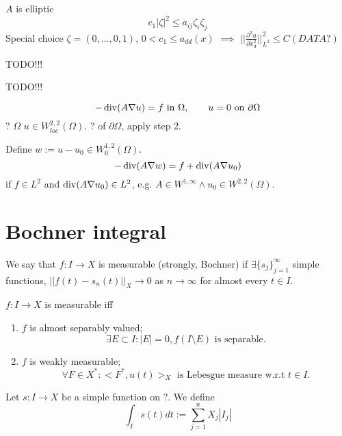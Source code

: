 \documentclass[12pt]{article}					%
\begin{document}
\begin{veta}
\begin{dukazin}
		$A$ is elliptic
		$$ c_1|\zeta|^2 ≤ a_{ij} \zeta_i\zeta_j $$
		Special choice $\zeta = (0, …, 0, 1)$, $0 < c_1 ≤ a_{dd}(x)$ $\implies$ $||\frac{\partial^2 u}{\partial x_d^2}||_{L^2}^2 ≤ C(DATA?) $
	\end{dukazin}

	\begin{dukazin}
		TODO!!!	


		TODO!!!
	\end{dukazin}

	\begin{dukazin}
		$$ -\operatorname{div}(A \nabla u) = f \text{ in } \Omega, \qquad u = 0 \text{ on } \partial \Omega $$
		? $\Omega$ $u \in W_{loc}^{2, 2}(\Omega)$. ? of $\partial \Omega$, apply step 2.

		Define $w := u - u_0 \in W_0^{1, 2}(\Omega)$.
		$$ -\operatorname{div}(A \nabla w) = f + \operatorname{div}(A \nabla u_0) $$
		if $f \in L^2$ and $\operatorname{div}(A \nabla u_0) \in L^2$, e.g. $A \in W^{1, ∞} \land u_0 \in W^{2, 2}(\Omega)$.
	\end{dukazin}
\end{veta}

\section{Bochner integral}
\begin{definice}[Measurability]
	We say that $f: I \rightarrow X$ is measurable (strongly, Bochner) if $\exists \{s_j\}_{j=1}^∞$ simple functions, $||f(t) - s_n(t)||_X \rightarrow 0$ as $n \rightarrow ∞$ for almost every $t \in I$.
\end{definice}

\begin{veta}[Measurability]
	$f: I \rightarrow X$ is measurable iff

	\begin{enumerate}
		\item $f$ is almost separably valued;
			$$ \exists E \subset I: |E| = 0, f(I \setminus E) \text{ is separable}. $$
		\item $f$ is weakly measurable;
			$$ \forall F \in X^*: <F^*, u(t)>_X \text{ is Lebesgue measure w.r.t } t \in I. $$
	\end{enumerate}
\end{veta}

\begin{definice}
	Let $s: I \rightarrow X$ be a simple function on ?. We define
	$$ \int_I s(t) dt := \sum_{j=1}^n X_j |I_j| $$
\end{definice}
\end{document}

